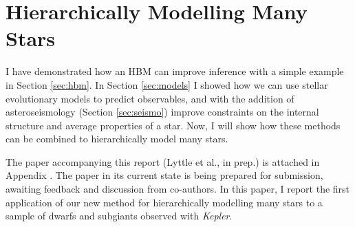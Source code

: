 \chapter{Hierarchically Modelling Many Stars}\label{ch:paper}

I have demonstrated how an HBM can improve inference with a simple example in Section \ref{sec:hbm}. In Section \ref{sec:models} I showed how we can use stellar evolutionary models to predict observables, and with the addition of asteroseismology (Section \ref{sec:seismo}) improve constraints on the internal structure and average properties of a star. Now, I will show how these methods can be combined to hierarchically model many stars.

The paper accompanying this report (Lyttle et al., in prep.) is attached in Appendix \label{apx:paper}. The paper in its current state is being prepared for submission, awaiting feedback and discussion from co-authors. In this paper, I report the first application of our new method for hierarchically modelling many stars to a sample of dwarfs and subgiants observed with \emph{Kepler}.
